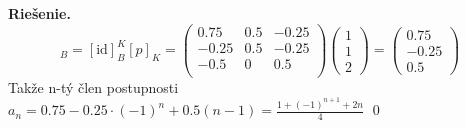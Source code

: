 \documentclass{article}
\theoremstyle{definition}
\theoremstyle{plain}
\newenvironment{solution}{\noindent\textbf{Riešenie.}\hspace{0.5em}}{\hfill\qed\medskip}
\begin{document}
\begin{solution}
\begin{equation*}
    [\{a_n\}]_B = [\text{id}]_B^K[p]_K = 
    \begin{pmatrix}
         0.75 & 0.5 &-0.25\\
         -0.25 &0.5 &-0.25\\
         -0.5 & 0 &0.5\\
    \end{pmatrix}
    \begin{pmatrix}
        1\\
        1\\
        2
    \end{pmatrix}
    =
    \begin{pmatrix}
        0.75\\
        -0.25\\
        0.5
    \end{pmatrix}
\end{equation*}
Takže n-tý člen postupnosti $a_n =0.75 -0.25\cdot (-1)^n + 0.5(n-1) = \frac{1 +(-1)^{n+1}+2n} {4} $ 
\end{solution}
\end{document}
